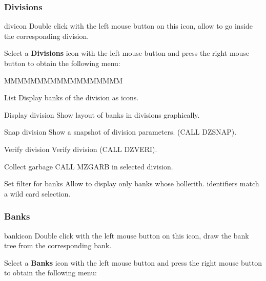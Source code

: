 \subsubsection{\ZEBRA{} Divisions}
\begin{ICON}{divicon}
Double click with the left mouse button on this icon, allow to go inside the
corresponding \ZEBRA{} division.
\end{ICON}

Select a {\bf \ZEBRA{} Divisions} icon with the left mouse button and press
the right mouse button to obtain the following menu:


\begin{DLsf}{MMMMMMMMMMMMMMMMMM}
\item[List]                      Display banks of the division as icons.
\item[Display division]          Show layout of banks in divisions graphically.
\item[Snap division]             Show a snapshot of division parameters.
                                 (CALL DZSNAP).
\item[Verify division]           Verify division (CALL DZVERI).
\item[Collect garbage]           CALL MZGARB in selected division.
\item[Set filter for banks]      Allow to display only banks whose hollerith.
                                 identifiers  match a wild card selection.
\end{DLsf}



\subsubsection{\ZEBRA{} Banks}
\begin{ICON}{bankicon}
Double click with the left mouse button on this icon, draw the bank tree from
the corresponding \ZEBRA{} bank.
\end{ICON}

Select a {\bf \ZEBRA{} Banks} icon with the left mouse button and press
the right mouse button to obtain the following menu:


